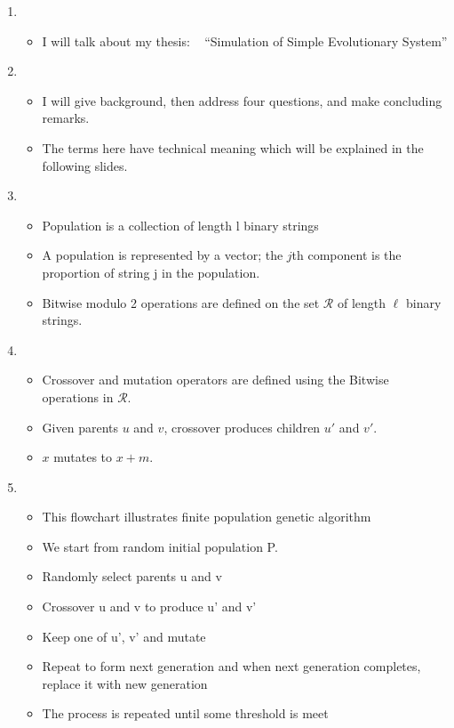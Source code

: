\documentclass{article}
\begin{document}
\setcounter{page}{1}    
\newlength{\mywidth}
\setlength{\mywidth}{0.9\linewidth}
\newlength{\myheight}
\setlength{\myheight}{0.5in}
    
\begin{enumerate}
\item
  \begin{itemize}
  \item I will talk about my thesis: \hfill\mbox{ }\linebreak
      ``Simulation of Simple Evolutionary System'' 
  \end{itemize}
    
\item
  \begin{itemize}
  \item
      I will give background, then address four questions, and make
      concluding remarks.
    \item The terms here have technical meaning which will be explained in the following slides.
  \end{itemize}

\item
  \begin{itemize}
  \item Population is a collection of length l binary strings 
  \item A population is represented by a vector; the $j$th component
      is the proportion of string j in the population.
    \item Bitwise modulo 2 operations are defined on the set $\mathcal{R}$ of length
      $\ell$ binary strings.
  \end{itemize}
    
\item
  \begin{itemize}
  \item Crossover and mutation operators are defined using the
    Bitwise operations in $\mathcal{R}$.
  \item Given parents $u$ and $v$, crossover produces children $u'$ and $v'$.
  \item $x$ mutates to $x + m$.
  \end{itemize}
    
\item
  \begin{itemize}
  \item This flowchart illustrates finite population genetic algorithm
  \item  We start from random initial population P.
  \item Randomly select parents u and v 
  \item Crossover u and v to produce u' and v'
  \item Keep one of u', v' and mutate
  \item Repeat to form next generation and when next generation completes, replace it with new generation
  \item The process is repeated until some threshold is meet
  \end{itemize}
    

\end{enumerate}
\end{document}
